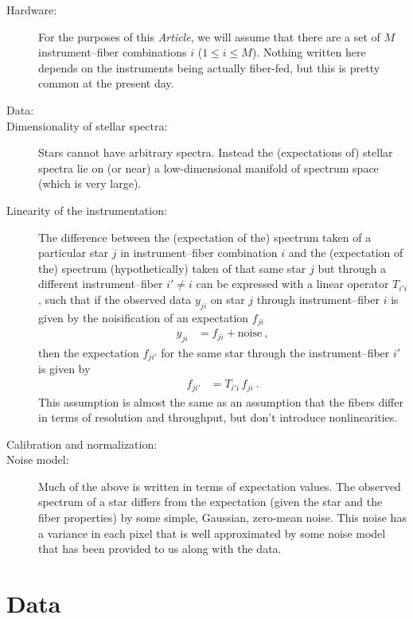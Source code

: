 \documentclass{article}
\newcommand{\documentname}{\textsl{Article}}
\begin{document}
\begin{description}
    \item[Hardware:] For the purposes of this \documentname, we will assume that there are a set of $M$ instrument--fiber combinations $i$ ($1\leq i\leq M$).
    Nothing written here depends on the instruments being actually fiber-fed, but this is pretty common at the present day.
    \item[Data:]
    \item[Dimensionality of stellar spectra:] Stars cannot have arbitrary spectra.
    Instead the (expectations of) stellar spectra lie on (or near) a low-dimensional manifold of spectrum space (which is very large).
    \item[Linearity of the instrumentation:] The difference between the (expectation of the) spectrum taken of a particular star $j$ in instrument--fiber combination $i$ and the (expectation of the) spectrum (hypothetically) taken of that same star $j$ but through a different instrument--fiber $i'\ne i$ can be expressed with a linear operator $T_{i'i}$, such that if the observed data $y_{ji}$ on star $j$ through instrument--fiber $i$ is given by the noisification of an expectation $f_{ji}$
    \begin{align}
        y_{ji} &= f_{ji} + \mbox{noise} ~,
    \end{align}
    then the expectation $f_{ji'}$ for the same star through the instrument--fiber $i'$ is given by
    \begin{align}
        f_{ji'} &= T_{i'i}\,f_{ji} ~.
    \end{align}
    This assumption is almost the same as an assumption that the fibers differ in terms of resolution and throughput, but don't introduce nonlinearities.
    \item[Calibration and normalization:] 
    \item[Noise model:] Much of the above is written in terms of expectation values.
    The observed spectrum of a star differs from the expectation (given the star and the fiber properties) by some simple, Gaussian, zero-mean noise.
    This noise has a variance in each pixel that is well approximated by some noise model that has been provided to us along with the data.
\end{description}

\section{Data}
\end{document}
